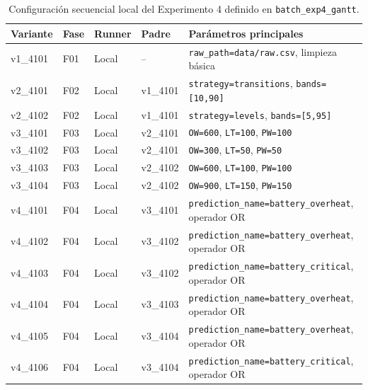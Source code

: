 \begin{table}[htbp]
    \centering
    \caption{Configuración secuencial local del Experimento 4 definido en \texttt{batch\_exp4\_gantt}.}
    \label{tab:params-exp4-gantt-local}
    \begin{tabular}{p{}p{}p{}p{}p{}}
        \hline
        \textbf{Variante} & \textbf{Fase} & \textbf{Runner} & \textbf{Padre} & \textbf{Parámetros principales} \\
        \hline
        v1\_4101 & F01 & Local & -- & \texttt{raw\_path=data/raw.csv}, limpieza básica \\
        v2\_4101 & F02 & Local & v1\_4101 & \texttt{strategy=transitions}, \texttt{bands=[10,90]} \\
        v2\_4102 & F02 & Local & v1\_4101 & \texttt{strategy=levels}, \texttt{bands=[5,95]} \\
        v3\_4101 & F03 & Local & v2\_4101 & \texttt{OW=600}, \texttt{LT=100}, \texttt{PW=100} \\
        v3\_4102 & F03 & Local & v2\_4101 & \texttt{OW=300}, \texttt{LT=50}, \texttt{PW=50} \\
        v3\_4103 & F03 & Local & v2\_4102 & \texttt{OW=600}, \texttt{LT=100}, \texttt{PW=100} \\
        v3\_4104 & F03 & Local & v2\_4102 & \texttt{OW=900}, \texttt{LT=150}, \texttt{PW=150} \\
        v4\_4101 & F04 & Local & v3\_4101 & \texttt{prediction\_name=battery\_overheat}, operador OR \\
        v4\_4102 & F04 & Local & v3\_4102 & \texttt{prediction\_name=battery\_overheat}, operador OR \\
        v4\_4103 & F04 & Local & v3\_4102 & \texttt{prediction\_name=battery\_critical}, operador OR \\
        v4\_4104 & F04 & Local & v3\_4103 & \texttt{prediction\_name=battery\_overheat}, operador OR \\
        v4\_4105 & F04 & Local & v3\_4104 & \texttt{prediction\_name=battery\_overheat}, operador OR \\
        v4\_4106 & F04 & Local & v3\_4104 & \texttt{prediction\_name=battery\_critical}, operador OR \\
        \hline
    \end{tabular}
\end{table}

